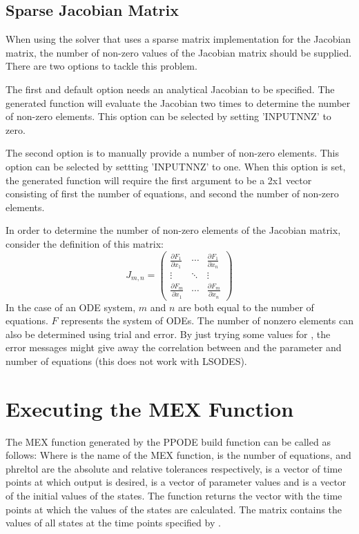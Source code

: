 \subsection{Sparse Jacobian Matrix}
When using the solver that uses a sparse matrix implementation for the Jacobian matrix, the number of non-zero values of the Jacobian matrix should be supplied. There are two options to tackle this problem.

The first and default option needs an analytical Jacobian to be specified. The generated function will evaluate the Jacobian two times to determine the number of non-zero elements. This option can be selected by setting 'INPUTNNZ' to zero.

The second option is to manually provide a number of non-zero elements. This option can be selected by settting 'INPUTNNZ' to one. When this option is set, the generated function will require the first argument to be a 2x1 vector consisting of first the number of equations, and second the number of non-zero elements.

In order to determine the number of non-zero elements of the Jacobian matrix, consider the definition of this matrix:
\begin{equation}
  J_{m,n} =
  \begin{pmatrix}
   \frac{\partial F_1}{\partial x_1} & \cdots & \frac{\partial F_1}{\partial x_n} \\
   \vdots & \ddots & \vdots  \\
   \frac{\partial F_m}{\partial x_1} & \cdots & \frac{\partial F_m}{\partial x_n}
  \end{pmatrix}
 \end{equation}
In the case of an ODE system, $m$ and $n$ are both equal to the number of equations. $F$ represents the system of ODEs.
The number of nonzero elements can also be determined using trial and error. By just trying some values for , the error messages might give away the correlation between  and the parameter and number of equations (this does not work with LSODES).

\section[Execution]{Executing the MEX Function}
The MEX function generated by the PPODE build function can be called as follows:
Where  is the name of the MEX function,  is the number of equations,  and ph{reltol} are the absolute and relative tolerances respectively,  is a vector of time points at which output is desired,  is a vector of parameter values and  is a vector of the initial values of the states. The function returns the vector  with the time points at which the values of the states are calculated. The matrix  contains the values of all states at the time points specified by .